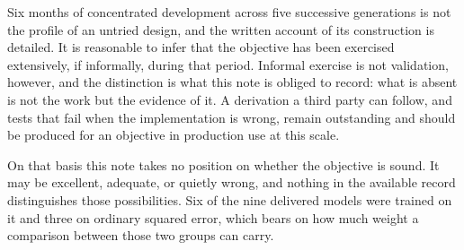Six months of concentrated development across five successive generations is not the profile of an
untried design, and the written account of its construction is detailed. It is reasonable to infer
that the objective has been exercised extensively, if informally, during that period. Informal
exercise is not validation, however, and the distinction is what this note is obliged to record:
what is absent is not the work but the evidence of it. A derivation a third party can follow, and
tests that fail when the implementation is wrong, remain outstanding and should be produced for an
objective in production use at this scale.

On that basis this note takes no position on whether the objective is sound. It may be excellent,
adequate, or quietly wrong, and nothing in the available record distinguishes those possibilities.
Six of the nine delivered models were trained on it and three on ordinary squared error, which
bears on how much weight a comparison between those two groups can carry.
